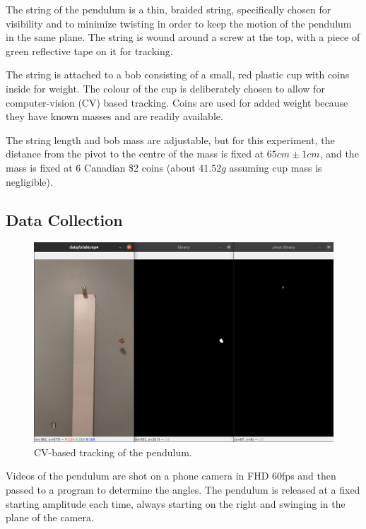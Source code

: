 \documentclass[aps,twocolumn,secnumarabic,nobalancelastpage,amsmath,amssymb,nofootinbib,letterpaper]{revtex4}
\begin{document}
The string of the pendulum is a thin, braided string, specifically chosen for visibility and to minimize twisting in
order to keep the motion of the pendulum in the same plane. The string is wound around a screw at the top, with a piece
of green reflective tape on it for tracking.

The string is attached to a bob consisting of a small, red plastic cup with coins inside for weight. The colour of the
cup is deliberately chosen to allow for computer-vision (CV) based tracking. Coins are used for added weight because
they have known masses and are readily available.

The string length and bob mass are adjustable, but for this experiment, the distance from the pivot to the centre of the
mass is fixed at \(65\si{cm} \pm 1\si{cm}\), and the mass is fixed at 6 Canadian \$2 coins (about \(41.52\si{g}\)
assuming cup mass is negligible).

\subsection{Data Collection}
\label{section:method:data_collection}

\begin{figure}[htb]
    \includegraphics[width=\linewidth]{cv_track.png}
    \caption{CV-based tracking of the pendulum.}
\end{figure}

Videos of the pendulum are shot on a phone camera in FHD 60fps and then passed to a program to determine the angles.
The pendulum is released at a fixed starting amplitude each time, always starting on the right and swinging in the plane
of the camera.
\end{document}
